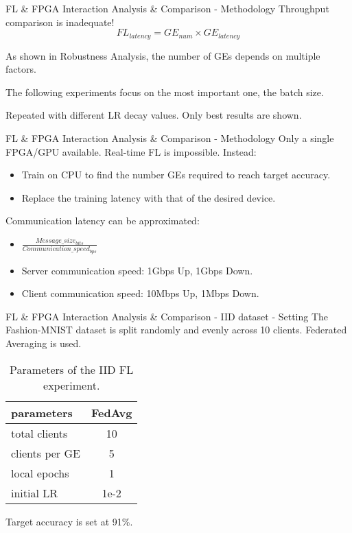 \begin{frame}{FL \& FPGA Interaction Analysis \& Comparison - Methodology}
    Throughput comparison is inadequate!
    \begin{equation*}
        FL_{latency} = GE_{num} \times GE_{latency}
    \end{equation*}
    
    As shown in Robustness Analysis, the number of GEs depends on multiple factors. 

    The following experiments focus on the most important one, the batch size. 
    
    Repeated with different LR decay values. Only best results are shown.
\end{frame}

\begin{frame}{FL \& FPGA Interaction Analysis \& Comparison - Methodology}
    Only a single FPGA/GPU available. Real-time FL is impossible. Instead:\\
    \begin{itemize}
        \item Train on CPU to find the number GEs required to reach target accuracy.
        \item Replace the training latency with that of the desired device.
    \end{itemize}
    
    Communication latency can be approximated:\\
    \begin{itemize}
        \item $\frac{ Message\_size_{bits} }{ Communication\_speed_{bps} }$
        \item Server communication speed: 1Gbps Up, 1Gbps Down.
        \item Client communication speed: 10Mbps Up, 1Mbps Down.
    \end{itemize}
\end{frame}

\begin{frame}{FL \& FPGA Interaction Analysis \& Comparison - IID dataset - Setting}
    The Fashion-MNIST dataset is split randomly and evenly across 10 clients. Federated Averaging is used.
    \begin{table}[H]
        \center
        \begin{tabular}
            { | l | c | }
            \hline
            parameters & FedAvg\\\hline
            total clients   & 10\\\hline
            clients per GE  & 5\\\hline
            local epochs    & 1\\\hline
            initial LR      & 1e-2\\\hline
        \end{tabular}
        \caption*{Parameters of the IID FL experiment.}
    \end{table}
    Target accuracy is set at 91\%.
\end{frame}

